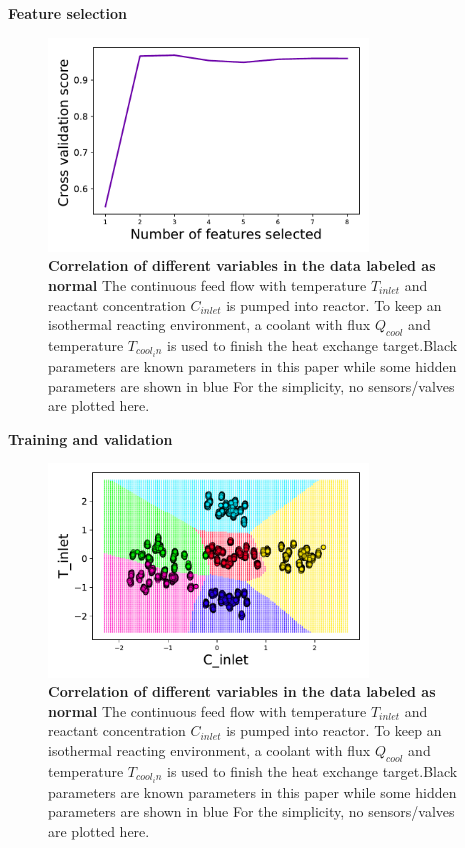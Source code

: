 \documentclass[fleqn,11pt]{wlscirep}
\begin{document}
\textbf{Feature selection}
\begin{figure}[h]
    \centering
    \includegraphics[width=8.5cm]{figure4.pdf}
    \caption{
    \textbf{Correlation of different variables in the data labeled as normal  } The continuous feed flow with temperature $T_{inlet}$ and reactant concentration $C_{inlet}$ is pumped into reactor. To keep an isothermal reacting environment, a coolant with flux $Q_{cool}$ and temperature $T_{cool_in} $ is used to finish the heat exchange target.Black parameters are known parameters in this paper while some hidden parameters  are shown in blue For the simplicity, no sensors/valves are plotted here.}
    \label{fig:1}
\end{figure}


\textbf{Training and validation}

\begin{figure}[h]
    \centering
    \includegraphics[width=8.5cm]{figure5.pdf}
    \caption{
    \textbf{Correlation of different variables in the data labeled as normal  } The continuous feed flow with temperature $T_{inlet}$ and reactant concentration $C_{inlet}$ is pumped into reactor. To keep an isothermal reacting environment, a coolant with flux $Q_{cool}$ and temperature $T_{cool_in} $ is used to finish the heat exchange target.Black parameters are known parameters in this paper while some hidden parameters  are shown in blue For the simplicity, no sensors/valves are plotted here.}
    \label{fig:1}
\end{figure}
\end{document}
